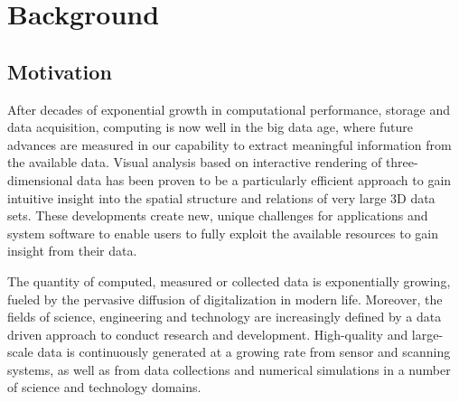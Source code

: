 
\chapter{Background}

\section{Motivation}

After decades of exponential growth in computational performance, storage and
data acquisition, computing is now well in the big data age, where future
advances are measured in our capability to extract meaningful information from
the available data. Visual analysis based on interactive rendering of
three-dimensional data has been proven to be a particularly efficient approach
to gain intuitive insight into the spatial structure and relations of very large
3D data sets. These developments create new, unique challenges for applications
and system software to enable users to fully exploit the available resources to
gain insight from their data.

The quantity of computed, measured or collected data is exponentially growing,
fueled by the pervasive diffusion of digitalization in modern life. Moreover,
the fields of science, engineering and technology are increasingly defined by a
data driven approach to conduct research and development. High-quality and
large-scale data is continuously generated at a growing rate from sensor and
scanning systems, as well as from data collections and numerical simulations in
a number of science and technology domains.

